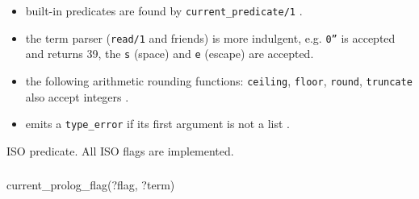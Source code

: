 \begin{itemize}

\item built-in predicates are found by \texttt{current\_predicate/1}
.

\item the term parser (\texttt{read/1} and friends) is more indulgent, e.g. \texttt{0''} is
  accepted and returns 39, the  \texttt{{\bs}s} (space) and
  \texttt{{\bs}e} (escape) are accepted.

\item the following arithmetic rounding functions: \texttt{ceiling}, \texttt{floor},
  \texttt{round}, \texttt{truncate} also accept integers .

\item {} emits a \texttt{type\_error} if its first argument is not a list .
\end{itemize}

\begin{PlErrors}







\end{PlErrors}

\Portability

ISO predicate. All ISO flags are implemented.

\subsubsection{\label{current-prolog-flag/2}}

\begin{TemplatesOneCol}
current\_prolog\_flag(?flag, ?term)

\end{TemplatesOneCol}

